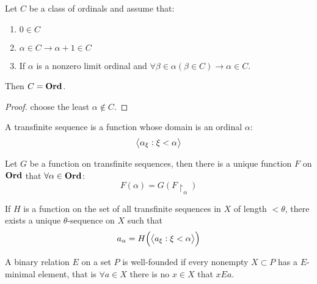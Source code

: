 \begin{theorem}
    Let $C$ be a class of ordinals and assume that:
    \begin{enumerate}
        \item $0 \in C$
        \item $\alpha \in C \rightarrow \alpha + 1 \in C$
        \item If $\alpha$ is a nonzero limit ordinal and $\forall \beta \in \alpha (\beta \in C) \rightarrow \alpha \in C$.
    \end{enumerate}
    Then $C = \mathbf{Ord}$.
\end{theorem}
\begin{proof}
    choose the least $\alpha \notin C$.
\end{proof}






\begin{definition}
    A transfinite sequence is a function whose domain is an ordinal $\alpha$:
    \begin{equation}
        \transfinitesequence{\alpha_\xi : \xi < \alpha}
    \end{equation}
\end{definition}

\begin{theorem}
    Let $G$ be a function on transfinite sequences, then there is a unique function $F$ on $\mathbf{Ord}$ that $\forall \alpha \in \mathbf{Ord}$:
    \begin{equation}
        F(\alpha) = G(F\restriction_\alpha)
    \end{equation}
    
    If $H$ is a function on the set of all transfinite sequences in $X$ of length $< \theta$, there exists a unique $\theta$-sequence on $X$ such that 
    \begin{equation}
        a_\alpha = H\mleft(\transfinitesequence{a_\xi : \xi < \alpha} \mright)
    \end{equation}
\end{theorem}


\begin{definition}
    A binary relation $E$ on a set $P$ is well-founded if every nonempty $X \subset P$ has a $E$-minimal element, that is $\forall a \in X$ there is no $x \in X$ that $x E a$.
\end{definition}

